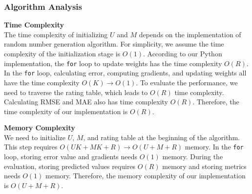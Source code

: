 \documentclass{article}
\begin{document}
\subsubsection{Algorithm Analysis}
\noindent\textbf{Time Complexity}\\
The time complexity of initializing $U$ and $M$ depends on the implementation of random number generation algorithm. For simplicity, we assume the time complexity of the initialization stage is $O(1)$. According to our Python implementation, the \texttt{for} loop to update weights has the time complexity $O(R)$. In the \texttt{for} loop, calculating error, computing gradients, and updating weights all have the time complexity $O(K) \rightarrow O(1)$. To evaluate the performance, we need to traverse the rating table, which leads to $O(R)$ time complexity. Calculating RMSE and MAE also has time complexity $O(R)$. Therefore, the time complexity of our implementation is $O(R)$.\par 
\vspace{0.3cm}
\noindent\textbf{Memory Complexity}\\
We need to initialize $U$, $M$, and rating table at the beginning of the algorithm. This step requires $O(UK + MK + R)\rightarrow O(U + M + R)$ memory. In the \texttt{for} loop, storing error value and gradients needs $O(1)$ memory. During the evaluation, storing predicted values requires $O(R)$ memory and storing metrics needs $O(1)$ memory. Therefore, the memory complexity of our implementation is $O(U + M + R)$.
\end{document}
